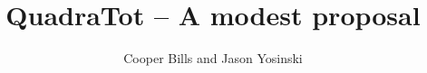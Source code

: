 \documentclass[11pt,letterpaper]{article}
\title{QuadraTot -- A modest proposal}
\author{Cooper Bills and Jason Yosinski \\
\code{\{csb88,jy495\}@cornell.edu}}
\begin{document}
\maketitle

\begin{abstract}

\end{abstract}




\end{document}
